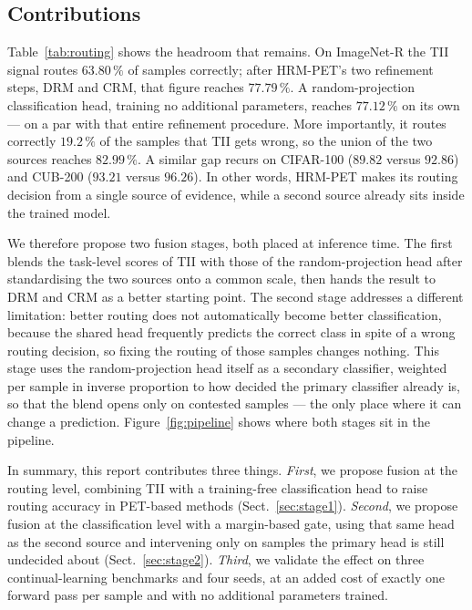 \documentclass[11pt,a4paper]{article}
\begin{document}
\subsection{Contributions}

Table~\ref{tab:routing} shows the headroom that remains. On ImageNet-R the TII
signal routes $63.80\,\%$ of samples correctly; after HRM-PET's two refinement
steps, DRM and CRM, that figure reaches $77.79\,\%$. A random-projection
classification head, training no additional parameters, reaches $77.12\,\%$ on
its own --- on a par with that entire refinement procedure. More importantly, it
routes correctly $19.2\,\%$ of the samples that TII gets wrong, so the union of
the two sources reaches $82.99\,\%$. A similar gap recurs on CIFAR-100 ($89.82$
versus $92.86$) and CUB-200 ($93.21$ versus $96.26$). In other words, HRM-PET
makes its routing decision from a single source of evidence, while a second
source already sits inside the trained model.

We therefore propose two fusion stages, both placed at inference time. The first
blends the task-level scores of TII with those of the random-projection head
after standardising the two sources onto a common scale, then hands the result
to DRM and CRM as a better starting point. The second stage addresses a
different limitation: better routing does not automatically become better
classification, because the shared head frequently predicts the correct class in
spite of a wrong routing decision, so fixing the routing of those samples
changes nothing. This stage uses the random-projection head itself as a
secondary classifier, weighted per sample in inverse proportion to how decided
the primary classifier already is, so that the blend opens only on contested
samples --- the only place where it can change a prediction.
Figure~\ref{fig:pipeline} shows where both stages sit in the pipeline.

In summary, this report contributes three things. \emph{First}, we propose
fusion at the routing level, combining TII with a training-free classification
head to raise routing accuracy in PET-based methods
(Sect.~\ref{sec:stage1}). \emph{Second}, we propose fusion at the
classification level with a margin-based gate, using that same head as the
second source and intervening only on samples the primary head is still
undecided about (Sect.~\ref{sec:stage2}). \emph{Third}, we validate the effect
on three continual-learning benchmarks and four seeds, at an added cost of
exactly one forward pass per sample and with no additional parameters trained.
\end{document}
